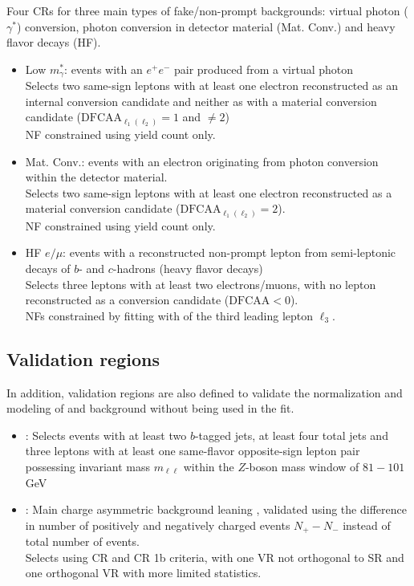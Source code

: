 \documentclass[../thesis.tex]{subfiles}
\begin{document}
Four CRs for three main types of fake/non-prompt backgrounds: virtual photon ($\gamma^{*}$) conversion, photon conversion in detector material (Mat. Conv.) and heavy flavor decays (HF).\\
\begin{itemize}
\item Low $m_\gamma^{*}$: events with an $e^+ e^-$ pair produced from a virtual photon\\
Selects two same-sign leptons with at least one electron reconstructed as an internal conversion candidate and neither as with a material conversion candidate ($\mathrm{DFCAA}_{\ell_1(\ell_2)}=1$ and $\neq 2$)\\
NF constrained using yield count only.
\item Mat. Conv.: events with an electron originating from photon conversion within the detector material.\\
Selects two same-sign leptons with at least one electron reconstructed as a material conversion candidate ($\mathrm{DFCAA}_{\ell_1(\ell_2)}=2$).\\
NF constrained using yield count only.
\item HF $e/\mu$: events with a reconstructed non-prompt lepton from semi-leptonic decays of $b$- and $c$-hadrons (heavy flavor decays)\\
Selects three leptons with at least two electrons/muons, with no lepton reconstructed as a conversion candidate ($\mathrm{DFCAA}<0$).\\
NFs constrained by fitting with \pT of the third leading lepton $\ell_3$.
\end{itemize}
\subsection{Validation regions}
In addition, validation regions are also defined to validate the normalization and modeling of \ttZ and \ttW background without being used in the fit.

\begin{itemize}
\item \ttZ : Selects events with at least two $b$-tagged jets, at least four total jets and three leptons with at least one same-flavor opposite-sign lepton pair possessing invariant mass $m_{\ell\ell}$ within the $Z$-boson mass window of $81-101$ GeV
\item \ttW : Main charge asymmetric background leaning \ttWplus, validated using the difference in number of positively and negatively charged events $N_{+}-N_{-}$ instead of total number of events.\\
Selects using CR \ttW and CR 1b criteria, with one VR not orthogonal to SR and one orthogonal VR with more limited statistics.
\end{itemize}
\end{document}
